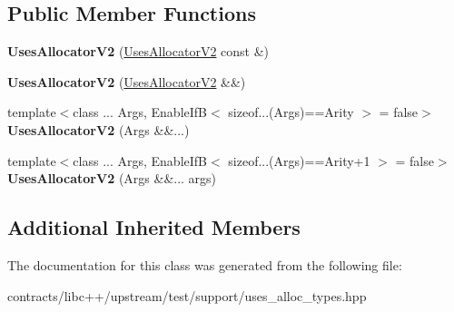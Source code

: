 \subsection*{Public Member Functions}
\begin{DoxyCompactItemize}
\item 
\mbox{\label{class_uses_allocator_v2_aa30200fcdf1acd77031c0b9885d51785}} 
{\bfseries Uses\+Allocator\+V2} (\mbox{\hyperlink{class_uses_allocator_v2}{Uses\+Allocator\+V2}} const \&)
\item 
\mbox{\label{class_uses_allocator_v2_af8d468427686715ffc04ba8a2efa9f49}} 
{\bfseries Uses\+Allocator\+V2} (\mbox{\hyperlink{class_uses_allocator_v2}{Uses\+Allocator\+V2}} \&\&)
\item 
\mbox{\label{class_uses_allocator_v2_a1dea940ab8fbea626103f78c92bee2f4}} 
{\footnotesize template$<$class ... Args, Enable\+If\+B$<$ sizeof...(\+Args)==\+Arity $>$  = false$>$ }\\{\bfseries Uses\+Allocator\+V2} (Args \&\&...)
\item 
\mbox{\label{class_uses_allocator_v2_abc435351fb97c5f05291e85f871e57b6}} 
{\footnotesize template$<$class ... Args, Enable\+If\+B$<$ sizeof...(\+Args)==\+Arity+1 $>$  = false$>$ }\\{\bfseries Uses\+Allocator\+V2} (Args \&\&... args)
\end{DoxyCompactItemize}
\subsection*{Additional Inherited Members}


The documentation for this class was generated from the following file\+:\begin{DoxyCompactItemize}
\item 
contracts/libc++/upstream/test/support/uses\+\_\+alloc\+\_\+types.\+hpp\end{DoxyCompactItemize}
